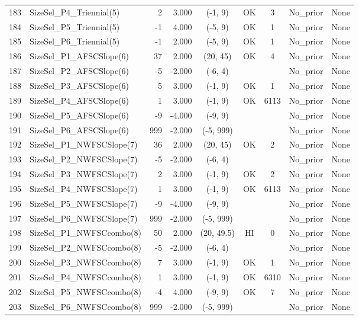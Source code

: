 \documentclass[12pt,]{article}
\begin{document}
\begin{landscape}
\begin{longtable}{rlrrcccll}
  183 & SizeSel\_P4\_Triennial(5) & 2 & 3.000 & (-1, 9) & OK & 3 & No\_prior & None \\ 
  184 & SizeSel\_P5\_Triennial(5) & -1 & 4.000 & (-5, 9) & OK & 1 & No\_prior & None \\ 
  185 & SizeSel\_P6\_Triennial(5) & -1 & 2.000 & (-5, 9) & OK & 1 & No\_prior & None \\ 
  186 & SizeSel\_P1\_AFSCSlope(6) & 37 & 2.000 & (20, 45) & OK & 4 & No\_prior & None \\ 
  187 & SizeSel\_P2\_AFSCSlope(6) & -5 & -2.000 & (-6, 4) &  &  & No\_prior & None \\ 
  188 & SizeSel\_P3\_AFSCSlope(6) & 5 & 3.000 & (-1, 9) & OK & 1 & No\_prior & None \\ 
  189 & SizeSel\_P4\_AFSCSlope(6) & 1 & 3.000 & (-1, 9) & OK & 6113 & No\_prior & None \\ 
  190 & SizeSel\_P5\_AFSCSlope(6) & -9 & -4.000 & (-9, 9) &  &  & No\_prior & None \\ 
  191 & SizeSel\_P6\_AFSCSlope(6) & 999 & -2.000 & (-5, 999) &  &  & No\_prior & None \\ 
  192 & SizeSel\_P1\_NWFSCSlope(7) & 36 & 2.000 & (20, 45) & OK & 2 & No\_prior & None \\ 
  193 & SizeSel\_P2\_NWFSCSlope(7) & -5 & -2.000 & (-6, 4) &  &  & No\_prior & None \\ 
  194 & SizeSel\_P3\_NWFSCSlope(7) & 2 & 3.000 & (-1, 9) & OK & 2 & No\_prior & None \\ 
  195 & SizeSel\_P4\_NWFSCSlope(7) & 1 & 3.000 & (-1, 9) & OK & 6113 & No\_prior & None \\ 
  196 & SizeSel\_P5\_NWFSCSlope(7) & -9 & -4.000 & (-9, 9) &  &  & No\_prior & None \\ 
  197 & SizeSel\_P6\_NWFSCSlope(7) & 999 & -2.000 & (-5, 999) &  &  & No\_prior & None \\ 
  198 & SizeSel\_P1\_NWFSCcombo(8) & 50 & 2.000 & (20, 49.5) & HI & 0 & No\_prior & None \\ 
  199 & SizeSel\_P2\_NWFSCcombo(8) & -5 & -2.000 & (-6, 4) &  &  & No\_prior & None \\ 
  200 & SizeSel\_P3\_NWFSCcombo(8) & 7 & 3.000 & (-1, 9) & OK & 1 & No\_prior & None \\ 
  201 & SizeSel\_P4\_NWFSCcombo(8) & 1 & 3.000 & (-1, 9) & OK & 6310 & No\_prior & None \\ 
  202 & SizeSel\_P5\_NWFSCcombo(8) & -4 & 4.000 & (-9, 9) & OK & 7 & No\_prior & None \\ 
  203 & SizeSel\_P6\_NWFSCcombo(8) & 999 & -2.000 & (-5, 999) &  &  & No\_prior & None \\ 

\end{longtable}
\end{landscape}
\end{document}
